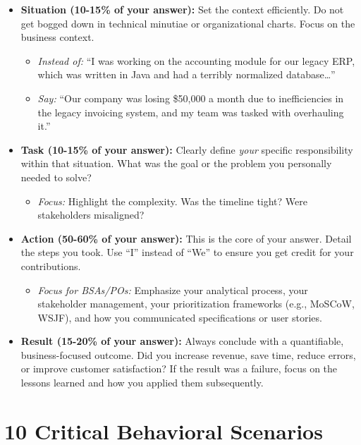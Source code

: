 \documentclass[
  11pt,
  openany,
  oneside]{book}
\providecommand{\tightlist}{%
  \setlength{\itemsep}{0pt}\setlength{\parskip}{0pt}}
\begin{document}
\begin{itemize}
\tightlist
\item
  \textbf{Situation (10-15\% of your answer):} Set the context
  efficiently. Do not get bogged down in technical minutiae or
  organizational charts. Focus on the business context.

  \begin{itemize}
  \tightlist
  \item
    \emph{Instead of:} ``I was working on the accounting module for our
    legacy ERP, which was written in Java and had a terribly normalized
    database\ldots{}''
  \item
    \emph{Say:} ``Our company was losing \$50,000 a month due to
    inefficiencies in the legacy invoicing system, and my team was
    tasked with overhauling it.''
  \end{itemize}
\item
  \textbf{Task (10-15\% of your answer):} Clearly define \emph{your}
  specific responsibility within that situation. What was the goal or
  the problem you personally needed to solve?

  \begin{itemize}
  \tightlist
  \item
    \emph{Focus:} Highlight the complexity. Was the timeline tight? Were
    stakeholders misaligned?
  \end{itemize}
\item
  \textbf{Action (50-60\% of your answer):} This is the core of your
  answer. Detail the steps you took. Use ``I'' instead of ``We'' to
  ensure you get credit for your contributions.

  \begin{itemize}
  \tightlist
  \item
    \emph{Focus for BSAs/POs:} Emphasize your analytical process, your
    stakeholder management, your prioritization frameworks (e.g.,
    MoSCoW, WSJF), and how you communicated specifications or user
    stories.
  \end{itemize}
\item
  \textbf{Result (15-20\% of your answer):} Always conclude with a
  quantifiable, business-focused outcome. Did you increase revenue, save
  time, reduce errors, or improve customer satisfaction? If the result
  was a failure, focus on the lessons learned and how you applied them
  subsequently.
\end{itemize}

\bigskip

\section{10 Critical Behavioral
Scenarios}\label{critical-behavioral-scenarios}
\end{document}
